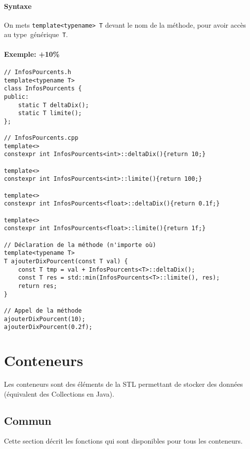 \documentclass[10pt,a4paper,french]{article}
\begin{document}
\paragraph{Syntaxe}
On mets \texttt{template<typename> T} devant le nom de la méthode, pour avoir accès au type~générique~{\tt T}.

\paragraph{Exemple: +10\%}
\begin{verbatim}
// InfosPourcents.h
template<typename T>
class InfosPourcents {
public:
    static T deltaDix();
    static T limite();
};

// InfosPourcents.cpp
template<>
constexpr int InfosPourcents<int>::deltaDix(){return 10;}

template<>
constexpr int InfosPourcents<int>::limite(){return 100;}

template<>
constexpr int InfosPourcents<float>::deltaDix(){return 0.1f;}

template<>
constexpr int InfosPourcents<float>::limite(){return 1f;}

// Déclaration de la méthode (n'importe où)
template<typename T>
T ajouterDixPourcent(const T val) {
    const T tmp = val + InfosPourcents<T>::deltaDix();
    const T res = std::min(InfosPourcents<T>::limite(), res);
    return res;
}

// Appel de la méthode
ajouterDixPourcent(10);
ajouterDixPourcent(0.2f);
\end{verbatim}

\section{Conteneurs}\label{containers}

Les conteneurs sont des éléments de la STL permettant de stocker des données (équivalent des Collections en Java).

\subsection{Commun}

Cette section décrit les fonctions qui sont disponibles pour tous les conteneurs.
\end{document}
